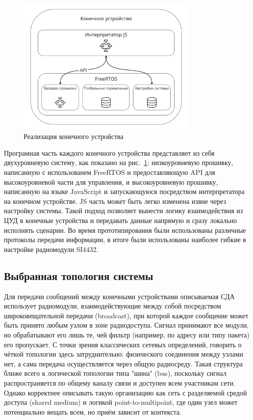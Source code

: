 \documentclass[a4paper,12pt]{article}
\begin{document}
\begin{figure}[H]
    \centering
    \includegraphics[width=0.8\textwidth]{images/Fig05.png}
    \caption{Реализация конечного устройства}
    \label{fig:end_device}
\end{figure}

Програмная часть каждого конечного устройства представляет из себя двухуровневую систему, как показано на рис.~\ref{fig:end_device}:
низкоуровневую прошивку, написанную с использованем FreeRTOS и предоставляющую API для высокоуровневой части для
управления, и высокоуровневую прошивку, написанную на языке JavaScript и запускающуюся посредством интерпретатора на
конечном устройстве. JS часть может быть легко изменена извне через настройку системы. Такой подход
позволяет вынести логику взаимодействия из ЦУД в конечные устройства и передавать данные напрямую и сразу локально
исполнять сценарии. Во время прототипирования были использованы различные протоколы передачи информации, в итоге
были использованы наиболее гибкие в настройке радиомодули SI4432.

\subsection{Выбранная топология системы}
Для передачи сообщений между конечными устройствами описываемая СДА использует радиомодули, взаимодействующие между собой посредством широковещательной передачи (broadcast), при которой каждое сообщение может быть принято любым узлом в зоне радиодоступа. Сигнал принимают все модули, но обрабатывают его лишь те, чей фильтр (например, по адресу или типу пакета) его пропускает. С точки зрения классических сетевых определений, говорить о чёткой топологии здесь затруднительно: физического соединения между узлами нет, а сама передача осуществляется через общую радиосреду. Такая структура ближе всего к логической топологии типа "шина" (bus), поскольку сигнал распространяется по общему каналу связи и доступен всем участникам сети. Однако корректнее описывать такую организацию как сеть с разделяемой средой доступа (shared medium) и логикой point-to-multipoint, где один узел может потенциально вещать всем, но приём зависит от контекста.
\end{document}
